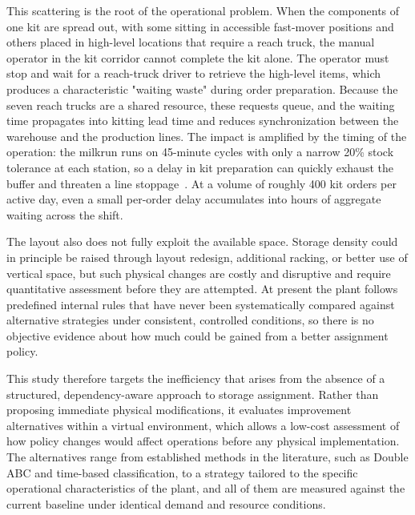 \documentclass[12pt,a4paper]{article}
\begin{document}
This scattering is the root of the operational problem. When the components of
one kit are spread out, with some sitting in accessible fast-mover positions
and others placed in high-level locations that require a reach truck, the
manual operator in the kit corridor cannot complete the kit alone. The
operator must stop and wait for a reach-truck driver to retrieve the
high-level items, which produces a characteristic "waiting waste" during order
preparation. Because the seven reach trucks are a shared resource, these
requests queue, and the waiting time propagates into kitting lead time and
reduces synchronization between the warehouse and the production lines. The
impact is amplified by the timing of the operation: the milkrun runs on
45-minute cycles with only a narrow 20\% stock tolerance at each station, so a
delay in kit preparation can quickly exhaust the buffer and threaten a line
stoppage~\cite{limere2012}. At a volume of roughly 400 kit orders per active
day, even a small per-order delay accumulates into hours of aggregate waiting
across the shift.

The layout also does not fully exploit the available space. Storage density
could in principle be raised through layout redesign, additional racking, or
better use of vertical space, but such physical changes are costly and
disruptive and require quantitative assessment before they are attempted. At
present the plant follows predefined internal rules that have never been
systematically compared against alternative strategies under consistent,
controlled conditions, so there is no objective evidence about how much could
be gained from a better assignment policy.

This study therefore targets the inefficiency that arises from the absence of
a structured, dependency-aware approach to storage assignment. Rather than
proposing immediate physical modifications, it evaluates improvement
alternatives within a virtual environment, which allows a low-cost assessment
of how policy changes would affect operations before any physical
implementation. The alternatives range from established methods in the
literature, such as Double ABC and time-based classification, to a strategy
tailored to the specific operational characteristics of the plant, and all of
them are measured against the current baseline under identical demand and
resource conditions.
\end{document}
